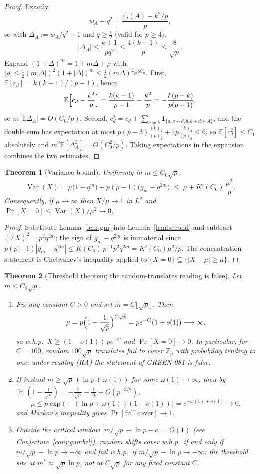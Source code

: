 \documentclass[11pt]{article}
\newtheorem{theorem}{Theorem}
\theoremstyle{definition}
\newcommand{\Zp}{\mathbb{Z}_p}
\newcommand{\E}{\mathbb{E}}
\newcommand{\Prob}{\Pr}
\newcommand{\Var}{\operatorname{Var}}
\begin{document}
\begin{proof}
Exactly,
\[
w_A-q^{2}=\frac{c_d(A)-k^{2}/p}{p},
\]
so with $\Delta_A:=w_A/q^{2}-1$ and $q\ge\tfrac12$ (valid for $p\ge4$),
\[
|\Delta_A|\le\frac{k+1}{pq^{2}}\le\frac{4(k+1)}{p}\le\frac8{\sqrt p}.
\]
Expand $(1+\Delta)^m=1+m\Delta+\rho$ with
$|\rho|\le\tfrac12(m|\Delta|)^{2}(1+|\Delta|)^{m}
\le\tfrac12(m\Delta)^{2}e^{8C_0}$.
First, $\E[c_d]=k(k-1)/(p-1)$, hence
\[
\E\Bigl[c_d-\frac{k^{2}}p\Bigr]=\frac{k(k-1)}{p-1}-\frac{k^{2}}p
=-\frac{k(p-k)}{p(p-1)},
\]
so $m\,|\E\Delta_A|=O(C_0/p)$. Second, $c_d^2=c_d+
\sum_{a\ne b}\mathbf 1_{\{a,a+d,b,b+d\in A\}}$, and the double sum has
expectation at most
$p(p-3)\frac{(k)_4}{(p)_4}+4p\frac{(k)_3}{(p)_3}\le6$, so $\E[c_d^2]\le C_1$
absolutely and $m^{2}\E[\Delta_A^{2}]=O(C_0^{2}/p)$. Taking expectations in
the expansion combines the two estimates.
\end{proof}

\begin{theorem}[Variance bound]\label{thm:var}
Uniformly in $m\le C_0\sqrt p$,
\[
\Var(X)=\mu\bigl(1-q^{m}\bigr)+p(p-1)\bigl(g_m-q^{2m}\bigr)
\;\le\;\mu+K'(C_0)\,\frac{\mu^{2}}{p}.
\]
Consequently, if $\mu\to\infty$ then $X/\mu\to1$ in $L^{2}$ and
$\Prob[X=0]\le\Var(X)/\mu^{2}\to0$.
\end{theorem}

\begin{proof}
Substitute Lemma~\ref{lem:gm} into Lemma~\ref{lem:second} and subtract
$(\E X)^2=p^{2}q^{2m}$; the sign of $g_m-q^{2m}$ is immaterial since
$p(p-1)|g_m-q^{2m}|\le K(C_0)\,p^{-1}p^{2}q^{2m}=K'(C_0)\mu^{2}/p$.
The concentration statement is Chebyshev's inequality applied to
$\{X=0\}\subseteq\{|X-\mu|\ge\mu\}$.
\end{proof}

\begin{theorem}[Threshold theorem; the random-translates reading is false]\label{thm:threshold}
Let $m\le C_0\sqrt p$.
\begin{enumerate}
\item[(i)] Fix any constant $C>0$ and set $m=C\lfloor\sqrt p\rfloor$. Then
\[
\mu=p\Bigl(1-\frac1{\sqrt p}\Bigr)^{C\sqrt p}=pe^{-C}(1+o(1))\longrightarrow\infty ,
\]
so w.h.p.\ $X\ge(1-o(1))\,pe^{-C}$ and
$\Prob[X=0]\to0$. In particular, for $C=100$, random $100\sqrt p$ translates
fail to cover $\Zp$ with probability tending to one: under reading (RA) the
statement of GREEN-081 is false.
\item[(ii)] If instead $m\ge\sqrt p\,(\ln p+\omega(1))$ for some
$\omega(1)\to\infty$, then by
$\ln(1-\tfrac1{\sqrt p})=-\tfrac1{\sqrt p}-\tfrac1{2p}+O(p^{-3/2})$,
\[
\mu\le p\exp\bigl(-(\ln p+\omega(1))(1-o(1))\bigr)=e^{-\omega(1)+o(1)}\to0 ,
\]
and Markov's inequality gives $\Prob[\text{full cover}]\to1$.
\item[(iii)] Outside the critical window
$|m/\sqrt p-\ln p-c|=O(1)$ (see Conjecture~\ref{conj:gumbel}), random shifts
cover w.h.p.\ if and only if $m/\sqrt p-\ln p\to+\infty$ and fail w.h.p.\ if
$m/\sqrt p-\ln p\to-\infty$: the threshold sits at
$m^{\ast}\approx\sqrt p\ln p$, not at $C\sqrt p$ for any fixed constant $C$.
\end{enumerate}
\end{theorem}
\end{document}
